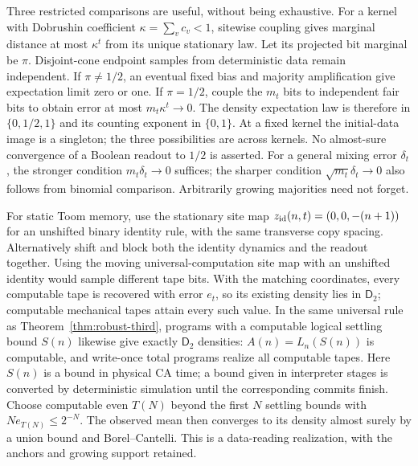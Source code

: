 Three restricted comparisons are useful, without being exhaustive.
For a kernel with Dobrushin coefficient $\kappa=\sum_vc_v<1$,
sitewise coupling gives marginal distance at most $\kappa^t$ from
its unique stationary law. Let its projected bit marginal be $\pi$.
Disjoint-cone endpoint samples from deterministic data remain
independent. If $\pi\ne1/2$, an eventual fixed bias and majority
amplification give expectation limit zero or one. If $\pi=1/2$,
couple the $m_t$ bits to independent fair bits to obtain error at
most $m_t\kappa^t\to0$. The density expectation law is therefore
in $\{0,1/2,1\}$ and its counting exponent in $\{0,1\}$.
At a fixed kernel the initial-data image is a singleton; the three
possibilities are across kernels. No almost-sure convergence of a
Boolean readout to $1/2$ is asserted. For a general mixing error
$\delta_t$, the stronger condition $m_t\delta_t\to0$ suffices;
the sharper condition $\sqrt{m_t}\delta_t\to0$ also follows from
binomial comparison. Arbitrarily growing majorities need not forget.

For static Toom memory, use the stationary site map
$z_{\rm id}(n,t)=(0,0,-(n+1))$ for an unshifted binary identity
rule, with the same transverse copy spacing. Alternatively shift and
block both the identity dynamics and the readout together. Using
the moving universal-computation site map with an unshifted identity
would sample different tape bits. With the matching coordinates,
every computable tape is recovered with error $e_t$, so its existing
density lies in $\mathsf D_2$; computable mechanical tapes attain
every such value. In the same universal rule as
Theorem~\ref{thm:robust-third}, programs with a computable logical
settling bound $S(n)$ likewise give exactly $\mathsf D_2$ densities:
$A(n)=L_n(S(n))$ is computable, and write-once total programs realize
all computable tapes. Here $S(n)$ is a bound in physical CA time;
a bound given in interpreter stages is converted by deterministic
simulation until the corresponding commits finish. Choose computable
even $T(N)$ beyond the first
$N$ settling bounds with $Ne_{T(N)}\leq2^{-N}$. The observed mean
then converges to its density almost surely by a union bound and
Borel--Cantelli. This is a data-reading realization, with the anchors
and growing support retained.

